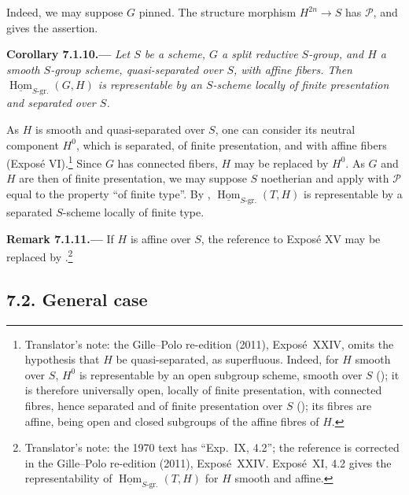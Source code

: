 Indeed, we may suppose \(G\) pinned. The structure morphism
\(H^{2n}\to S\) has \(\mathcal P\), and  gives the assertion.

\par\medskip\noindent{}\textbf{Corollary 7.1.10.---}\enspace
\emph{Let \(S\) be a scheme, \(G\) a split reductive \(S\)-group, and
\(H\) a smooth \(S\)-group scheme, quasi-separated over \(S\), with affine
fibers. Then
\(\underline{\operatorname{Hom}}_{S\text{-}\mathrm{gr.}}(G,H)\) is
representable by an \(S\)-scheme locally of finite presentation and
separated over \(S\).}

As \(H\) is smooth and quasi-separated over \(S\), one can consider its neutral
component \(H^0\), which is separated, of finite presentation, and with affine fibers
(Exposé VI).\footnote{Translator's note: the Gille--Polo re-edition (2011), Exposé~XXIV, omits
the hypothesis that \(H\) be quasi-separated, as superfluous. Indeed, for \(H\) smooth over \(S\),
\(H^0\) is representable by an open subgroup scheme, smooth over \(S\)
(); it is therefore universally open, locally
of finite presentation, with connected fibres, hence separated and of finite presentation over
\(S\) (); its fibres are affine, being open and closed
subgroups of the affine fibres of \(H\).}
Since \(G\) has connected fibers, \(H\) may be replaced by \(H^0\).
As \(G\) and \(H\) are then of finite presentation, we may suppose
\(S\) noetherian and apply  with \(\mathcal P\) equal to the
property ``of finite type''. By ,
\(\underline{\operatorname{Hom}}_{S\text{-}\mathrm{gr.}}(T,H)\) is
representable by a separated \(S\)-scheme locally of finite type.

\par\medskip\noindent{}\textbf{Remark 7.1.11.---}\enspace
If \(H\) is affine over \(S\), the reference to Exposé XV may be
replaced by .\footnote{Translator's note: the 1970
text has ``Exp.~IX, 4.2''; the reference is corrected in the Gille--Polo re-edition (2011),
Exposé~XXIV. Exposé~XI, 4.2 gives the representability of
\(\underline{\operatorname{Hom}}_{S\text{-}\mathrm{gr.}}(T,H)\) for \(H\) smooth and affine.}

\subsection*{7.2. General case}

